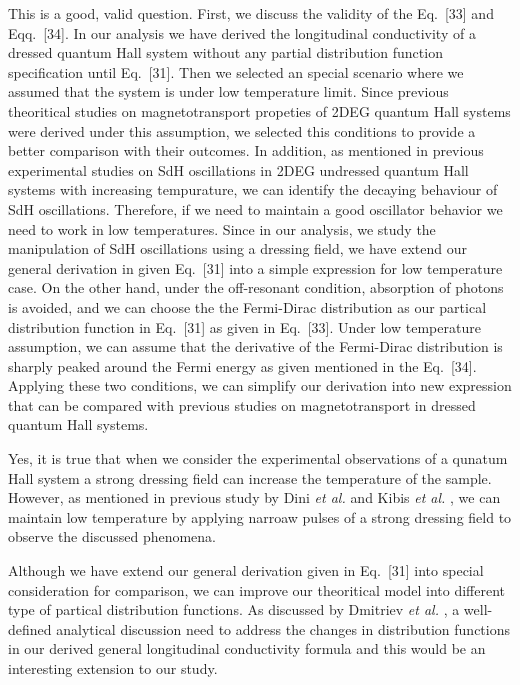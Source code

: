 \documentclass{article}
\begin{document}
This is a good, valid question. First, we discuss the validity of the Eq.~[33] and Eqq.~[34]. In our analysis we have derived the longitudinal conductivity of a dressed quantum Hall system without any partial distribution function specification until Eq.~[31]. Then we selected an special scenario where we assumed that the system is under low temperature limit. Since previous theoritical studies on magnetotransport propeties of 2DEG quantum Hall systems were derived under this assumption, we selected this conditions to provide a better comparison with their outcomes. In addition, as mentioned in previous experimental studies on SdH oscillations \cite{zudov03,mani02,arapov02} in 2DEG undressed quantum Hall systems with increasing tempurature, we can identify the decaying behaviour of SdH oscillations. Therefore, if we need to maintain a good oscillator behavior we need to work in low temperatures. Since in our analysis, we study the manipulation of SdH oscillations using a dressing field, we have extend our general derivation in given Eq.~[31] into a simple expression for low temperature case. On the other hand, under the off-resonant condition, absorption of photons is avoided, and we can choose the the Fermi-Dirac distribution as our partical distribution function in Eq.~[31] as given in Eq.~[33]. Under low temperature assumption, we can assume that the derivative of the Fermi-Dirac distribution is sharply peaked around the Fermi energy as given mentioned in the Eq.~[34]. Applying these two conditions, we can simplify our derivation into new expression that can be compared with previous studies on magnetotransport in dressed quantum Hall systems.

Yes, it is true that when we consider the experimental observations of a qunatum Hall system a strong dressing field can increase the temperature of the sample. However, as mentioned in previous study by Dini \textit{et al.} \cite{dini16} and Kibis \textit{et al.} \cite{kibis15}, we can maintain low temperature by applying narroaw pulses of a strong dressing field to observe the discussed phenomena.

Although we have extend our general derivation given in Eq.~[31] into special consideration for comparison, we can improve our theoritical model into different type of partical distribution functions. As discussed by Dmitriev \textit{et al.} \cite{dmitriev05}, a well-defined analytical discussion need to address the changes in distribution functions in our derived general longitudinal conductivity formula and this would be an interesting extension to our study.
\end{document}
